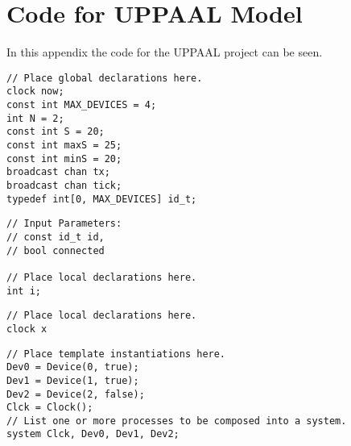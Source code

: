 \chapter{Code for UPPAAL Model}\label{app:UPPAALCode}
In this appendix the code for the UPPAAL project can be seen.

\begin{lstlisting}[language={[GUI]Uppaal}, % use GUI flavor
columns={[l]flexible},
frameround=fftt, frame=shadowbox, rulesepcolor=\color{gray},
caption={Code for the global declarations.}]
// Place global declarations here.
clock now;
const int MAX_DEVICES = 4;
int N = 2;
const int S = 20;
const int maxS = 25;
const int minS = 20;
broadcast chan tx;
broadcast chan tick;
typedef int[0, MAX_DEVICES] id_t;
\end{lstlisting}


\begin{lstlisting}[language={[GUI]Uppaal}, % use GUI flavor
columns={[l]flexible},
frameround=fftt, frame=shadowbox, rulesepcolor=\color{gray},
caption={Code for the local declarations for Device.}]
// Input Parameters:
// const id_t id, 
// bool connected

// Place local declarations here.
int i;
\end{lstlisting}

\begin{lstlisting}[language={[GUI]Uppaal}, % use GUI flavor
columns={[l]flexible},
frameround=fftt, frame=shadowbox, rulesepcolor=\color{gray},
caption={Code for the local declarations for Clock.}]
// Place local declarations here.
clock x
\end{lstlisting}

\begin{lstlisting}[language={[GUI]Uppaal}, % use GUI flavor
columns={[l]flexible},
frameround=fftt, frame=shadowbox, rulesepcolor=\color{gray},
caption={Code for system declarations.}]
// Place template instantiations here.
Dev0 = Device(0, true);
Dev1 = Device(1, true);
Dev2 = Device(2, false);
Clck = Clock();
// List one or more processes to be composed into a system.
system Clck, Dev0, Dev1, Dev2;
\end{lstlisting}